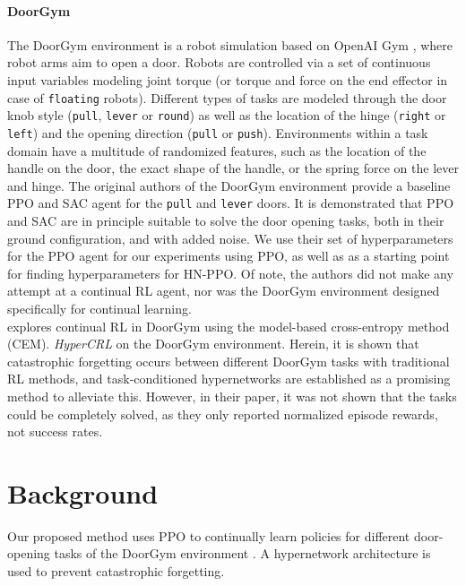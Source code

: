 \documentclass[dvipsnames]{article} %
\newcommand{\comment}[1]{}
\newcommand{\sa}[1] {\comment{{\color{cyan} SA: #1}}}                %
\newcommand{\as}[1] {\comment{{\color{orange} AS: #1}}}              %
\begin{document}
\sa{I'm not sure we need to write about LwF. But in any case, it will be beneficial to include an overview of continual RL methods (or those specifically applied to robotics). Check this paper for a review of such methods: \url{https://arxiv.org/pdf/2012.13490.pdf}. I also think that we need a little more content here.}

\paragraph{DoorGym} %
The DoorGym \citep{doorgym} environment is a robot simulation based on OpenAI Gym \citep{gym}, where robot arms aim to open a door. Robots are controlled via a set of continuous input variables modeling joint torque (or torque and force on the end effector in case of \texttt{floating} robots). Different types of tasks are modeled through the door knob style (\texttt{pull}, \texttt{lever} or \texttt{round}) as well as the location of the hinge (\texttt{right} or \texttt{left}) and the opening direction (\texttt{pull} or \texttt{push}). Environments within a task domain have a multitude of randomized features, such as the location of the handle on the door, the exact shape of the handle, or the spring force on the lever and hinge.
The original authors of the DoorGym environment \cite{doorgym} provide a baseline PPO and SAC agent for the \texttt{pull} and \texttt{lever} doors. It is demonstrated that PPO and SAC are in principle suitable to solve the door opening tasks, both in their ground configuration, and with added noise. We use their set of hyperparameters for the PPO agent for our experiments using PPO, as well as as a starting point for finding hyperparameters for HN-PPO. Of note, the authors did not make any attempt at a continual RL agent, nor was the DoorGym environment designed specifically for continual learning.\\
\citet{MBRLHypernetworks} explores continual RL in DoorGym using the model-based cross-entropy method (CEM). \textit{HyperCRL} on the DoorGym environment. Herein, it is shown that catastrophic forgetting occurs between different DoorGym tasks with traditional RL methods, and task-conditioned hypernetworks are established as a promising method to alleviate this. However, in their paper, it was not shown that the tasks could be completely solved, as they only reported normalized episode rewards, not success rates.


\section{Background}
\as{There should be here an introductory sentence on the areas you are going to review below and why. There has to be a link between them.}
Our proposed method uses PPO \citep{ppo} to continually learn policies for different door-opening tasks of the DoorGym environment \citep{doorgym}. A hypernetwork \cite{CLHypernetworks} architecture is used to prevent catastrophic forgetting.
\end{document}
